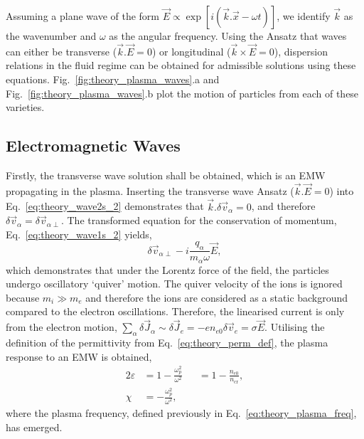 Assuming a plane wave of the form $\vec{E}\propto \exp{\left[ i\left( \vec{k}.\vec{x} - \omega t \right) \right]}$, we identify $\vec{k}$ as the wavenumber and $\omega$ as the angular frequency.
Using the Ansatz that waves can either be transverse ($\vec{k}.\vec{E}=0$) or longitudinal ($\vec{k}\times\vec{E}=0$), dispersion relations in the fluid regime can be obtained for admissible solutions using these equations.
Fig.~\ref{fig:theory_plasma_waves}.a and Fig.~\ref{fig:theory_plasma_waves}.b plot the motion of particles from each of these varieties.

\subsection{Electromagnetic Waves}%
\label{sec:theory_transwaves}

Firstly, the transverse wave solution shall be obtained, which is an \ac{EMW} propagating in the plasma.
Inserting the transverse wave Ansatz ($\vec{k}.\vec{E}=0$) into Eq.~\ref{eq:theory_wave2s_2} demonstrates that $\vec{k}.\delta\vec{v}_\alpha=0$, and therefore $\delta\vec{v}_\alpha = \delta\vec{v}_{\alpha\perp}$.
The transformed equation for the conservation of momentum, Eq.~\ref{eq:theory_wave1s_2} yields,
\begin{equation}
    \label{eq:theory_EMW_quiver}
    \delta\vec{v}_{\alpha\perp} - i \frac{q_\alpha}{m_\alpha \omega}\vec{E},
\end{equation}
which demonstrates that under the Lorentz force of the field, the particles undergo oscillatory `quiver' motion.
The quiver velocity of the ions is ignored because $m_i \gg m_e$ and therefore the ions are considered as a static background compared to the electron oscillations.
Therefore, the linearised current is only from the electron motion, $\sum\nolimits_\alpha\delta\vec{J}_\alpha\sim\delta\vec{J}_e = -e n_{e0}\delta \vec{v}_e = \sigma \vec{E}$.
Utilising the definition of the permittivity from Eq.~\ref{eq:theory_perm_def}, the plasma response to an \ac{EMW} is obtained,
\begin{alignat}{2}
    \label{eq:theory_emw_epsilon}
    \varepsilon &= 1 - \frac{\omega_p^2}{\omega^2} &&= 1- \frac{n_{e0}}{n_{\text{cr}}},\\
    \chi &= - \frac{\omega_p^2}{\omega^2}, &&
\end{alignat}
where the plasma frequency, defined previously in Eq.~\ref{eq:theory_plasma_freq}, has emerged.


